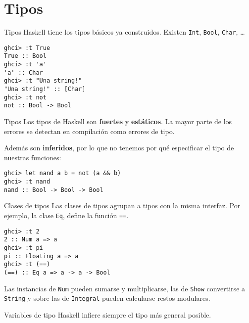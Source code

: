 \section{Tipos}

\begin{frame}[fragile]{Tipos}
  Haskell tiene los tipos básicos ya construidos. Existen
  \texttt{Int}, \texttt{Bool}, \texttt{Char}, \dots
  \begin{lstlisting}
ghci> :t True
True :: Bool
ghci> :t 'a'
'a' :: Char
ghci> :t "Una string!"
"Una string!" :: [Char]
ghci> :t not
not :: Bool -> Bool
  \end{lstlisting}
\end{frame}

\begin{frame}[fragile]{Tipos}
  Los tipos de Haskell son \textbf{fuertes} y \textbf{estáticos}.
  La mayor parte de los errores se detectan en compilación como errores de tipo.

  \espacio

  Además son \textbf{inferidos}, por lo que no tenemos por qué especificar el
  tipo de nuestras funciones:

  \espacio

  \begin{lstlisting}
ghci> let nand a b = not (a && b)
ghci> :t nand
nand :: Bool -> Bool -> Bool
  \end{lstlisting}
\end{frame}

\begin{frame}[fragile]{Clases de tipos}
Las clases de tipos agrupan a tipos con la misma interfaz.
Por ejemplo, la clase \texttt{Eq}, define la función \texttt{==}.

\espacio

\begin{lstlisting}
ghci> :t 2
2 :: Num a => a
ghci> :t pi
pi :: Floating a => a
ghci> :t (==)
(==) :: Eq a => a -> a -> Bool
\end{lstlisting}

\espacio

Las instancias de \texttt{Num} pueden sumarse y multiplicarse,
las de \texttt{Show} convertirse a \texttt{String}
y sobre las de \texttt{Integral} pueden calcularse restos modulares.
\end{frame}

\begin{frame}[fragile]{Variables de tipo}
  Haskell infiere siempre el tipo más general posible.
\end{frame}

